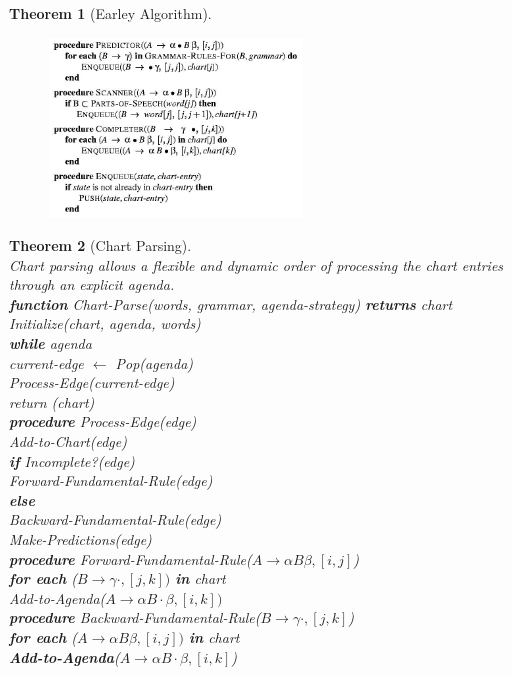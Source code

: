 \documentclass[12pt]{article}
\newcommand{\ind}{\hspace*{15pt}}
\newtheorem{theorem}{Theorem}[section]
\theoremstyle{definition}
\begin{document}
\begin{theorem}[Earley Algorithm]
\begin{figure}[h]
\includegraphics[width=0.6\textwidth]{earley2.jpg}
\end{figure}
\end{theorem}
\begin{theorem}[Chart Parsing]
\hfill\\\normalfont Chart parsing allows a flexible and dynamic order of processing the chart entries through an explicit agenda.\\

\textbf{function} Chart-Parse(words, grammar, agenda-strategy) \textbf{returns} chart\\
Initialize(chart, agenda, words)\\ 
\textbf{while} agenda\\
\ind current-edge $\leftarrow$ Pop(agenda)\\
\ind Process-Edge(current-edge)\\
return (chart)\\


\textbf{procedure} Process-Edge(edge)\\
\ind Add-to-Chart(edge)\\
\textbf{if} Incomplete?(edge)\\
\ind Forward-Fundamental-Rule(edge)\\
\textbf{else}\\
\ind Backward-Fundamental-Rule(edge)\\
Make-Predictions(edge)\\

\textbf{procedure} Forward-Fundamental-Rule($A\to \alpha B\beta,[i,j]$)\\
\textbf{for each} ($B\to \gamma\cdot, [j,k])$ \textbf{in} chart\\
\ind Add-to-Agenda($A\to\alpha B\cdot \beta,[i,k])$\\

\textbf{procedure} Backward-Fundamental-Rule($B\to \gamma\cdot, [j,k]$)\\
\textbf{for each} ($A\to\alpha B\beta, [i,j])$ \textbf{in} chart\\
\ind \textbf{Add-to-Agenda}($A\to\alpha B\cdot \beta, [i,k]$)\\


\end{theorem}
\end{document}
